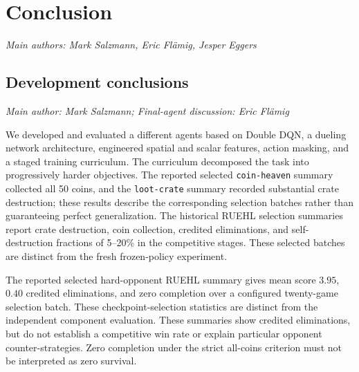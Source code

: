 \documentclass[11pt,a4paper]{article}
\newcommand{\contributionauthor}[1]{{\small\textit{Main author: #1}\par}}
\newcommand{\contributionauthors}[1]{{\small\textit{Main authors: #1}\par}}
\begin{document}
\endgroup
\begingroup\let\section\subsection\let\subsection\subsubsection
\endgroup
\section{Conclusion}
\contributionauthors{Mark Salzmann, Eric Flämig, Jesper Eggers}


\subsection{Development conclusions}
\contributionauthor{Mark Salzmann; Final-agent discussion: Eric Flämig}

We developed and evaluated a different agents based on Double DQN, a dueling network architecture, engineered spatial and scalar features, action masking, and a staged training curriculum. 
The curriculum decomposed the task into progressively harder objectives. The reported selected \texttt{coin-heaven} summary collected all 50 coins, and the \texttt{loot-crate} summary recorded substantial crate destruction; these results describe the corresponding selection batches rather than guaranteeing perfect generalization. 
The historical RUEHL selection summaries report crate destruction, coin collection, credited eliminations, and self-destruction fractions of 5--20\% in the competitive stages. These selected batches are distinct from the fresh frozen-policy experiment.

The reported selected hard-opponent RUEHL summary gives mean score $3.95$, $0.40$ credited eliminations, and zero completion over a configured twenty-game selection batch. These checkpoint-selection statistics are distinct from the independent component evaluation.  
These summaries show credited eliminations, but do not establish a competitive win rate or explain particular opponent counter-strategies. Zero completion under the strict all-coins criterion must not be interpreted as zero survival.
\end{document}
